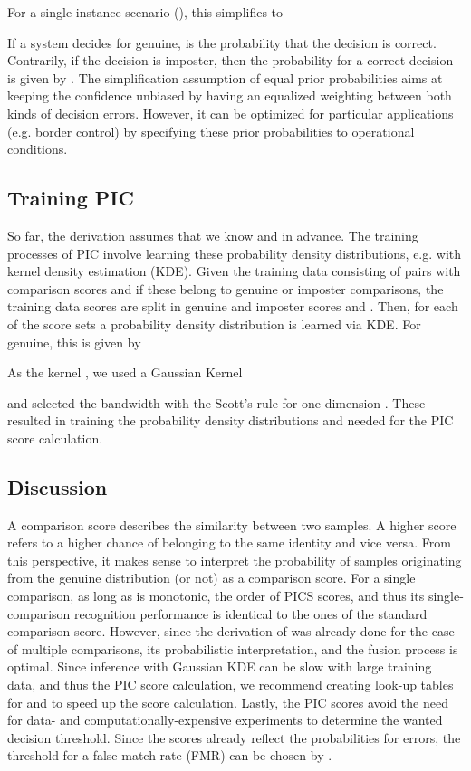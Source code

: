 \documentclass[10pt,twocolumn,letterpaper]{article}
\begin{document}
For a single-instance scenario (), this simplifies to

If a system decides for genuine,  is the probability that the decision is correct.
Contrarily, if the decision is imposter, then the probability for a correct decision is given by . 
{The simplification assumption of equal prior probabilities aims at keeping the confidence unbiased by having an equalized weighting between both kinds of decision errors.
However, it can be optimized for particular applications (e.g. border control) by specifying these prior probabilities to operational conditions.}


\subsection{Training PIC}
So far, the derivation assumes that we know  and  in advance.
The training processes of PIC involve learning these probability density distributions, e.g. with kernel density estimation (KDE). 
Given the training data  consisting of pairs with comparison scores  and if these belong to genuine or imposter comparisons, the training data scores are split in genuine and imposter scores  and .
Then, for each of the score sets a probability density distribution is learned via KDE. For genuine, this is given by

As the kernel , we used a Gaussian Kernel

and selected the bandwidth  with the Scott's rule for one dimension .
These resulted in training the probability density distributions  and  needed for the PIC score calculation.


\subsection{Discussion}
A comparison score describes the similarity between two samples.
A higher score refers to a higher chance of belonging to the same identity and vice versa.
From this perspective, it makes sense to interpret the probability of samples originating from the genuine distribution (or not) as a comparison score.
For a single comparison, as long as  is monotonic, the order of PICS scores, and thus its single-comparison recognition performance is identical to the ones of the standard comparison score.
However, since the derivation of  was already done for the case of multiple comparisons, its probabilistic interpretation, and the fusion process is optimal.
Since inference with Gaussian KDE can be slow with large training data, and thus the PIC score calculation, we recommend creating look-up tables for  and  to speed up the score calculation.
Lastly, the PIC scores avoid the need for data- and computationally-expensive experiments to determine the wanted decision threshold.
Since the scores already reflect the probabilities for errors, the threshold  for a false match rate (FMR) can be chosen by .
\end{document}
